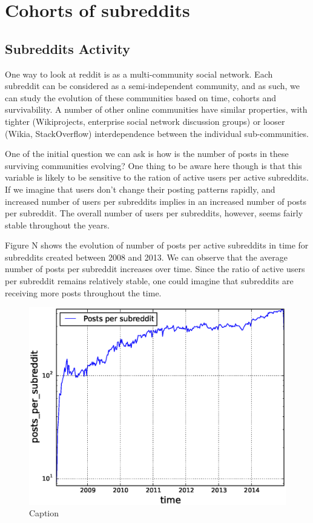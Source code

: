 \section{Cohorts of subreddits}

\subsection{Subreddits Activity}

One way to look at reddit is as a multi-community social network. Each subreddit can be considered as a semi-independent community, and as such, we can study the evolution of these communities based on time, cohorts and survivability.  A number of other online communities have similar properties, with tighter (Wikiprojects, enterprise social network discussion groups) or looser (Wikia, StackOverflow) interdependence between the individual sub-communities.

One of the initial question we can ask is how is the number of posts in these surviving communities evolving? One thing to be aware here though is that this variable is likely to be sensitive to the ration of active users per active subreddits. If we imagine that users don't change their posting patterns rapidly, and increased number of users per subreddits implies in an increased number of posts per subreddit. The overall number of users per subreddits, however, seems fairly stable throughout the years.

Figure N shows the evolution of number of posts per active subreddits in time for subreddits created between 2008 and 2013. We can observe that the average number of posts per subreddit increases over time. Since the ratio of active users per subreddit remains relatively stable, one could imagine that subreddits are receiving more posts throughout the time.

\begin{figure}[!tb]
\centering
\includegraphics[scale=0.4]{./images/posts_per_subreddit_over_time_total.eps}
\caption{Caption}
\label{fig:posts_per_subreddit_over_time_total}
\end{figure}

